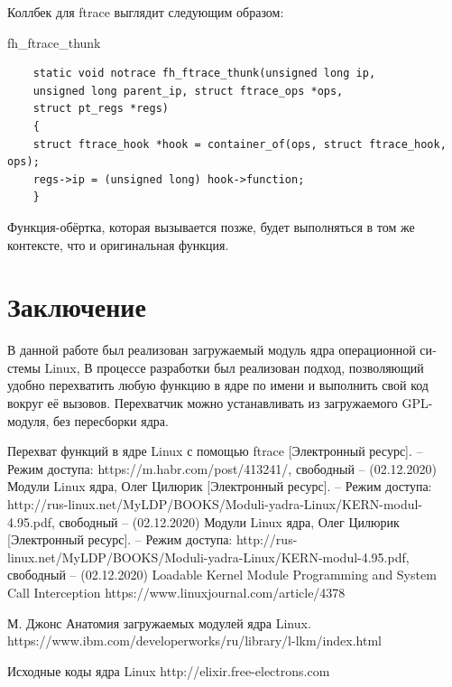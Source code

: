\documentclass[a4paper,14pt]{extarticle}
\begin{document}
Коллбек для ftrace выглядит следующим образом:

\begin{listing}[h]
	\caption{fh\_ftrace\_thunk}
	\begin{verbatim}
	static void notrace fh_ftrace_thunk(unsigned long ip, 
	unsigned long parent_ip, struct ftrace_ops *ops, 
	struct pt_regs *regs)
	{
	struct ftrace_hook *hook = container_of(ops, struct ftrace_hook, ops);
	regs->ip = (unsigned long) hook->function;
	}
	\end{verbatim}
\end{listing}

Функция-обёртка, которая вызывается позже, будет выполняться в том же контексте, что и оригинальная функция.
 
 \newpage
 	
 	\newpage
 	\section*{Заключение}
 	
 	В данной работе был реализован загружаемый модуль ядра операционной си­стемы Linux, В процессе разработки был реализован подход, позволяющий удобно перехватить любую функцию в ядре по имени и выполнить свой код вокруг её вызовов. Перехватчик можно устанавливать из загружаемого GPL-модуля, без пересборки ядра.
 	
 	\newpage
 	
 	\begin{thebibliography}{5}
 		Перехват функций в ядре Linux с помощью ftrace [Электронный ресурс]. – Режим доступа: 
 		https://m.habr.com/post/413241/, 
 		свободный – (02.12.2020)
 		Модули Linux ядра, Олег Цилюрик [Электронный ресурс]. – Режим доступа: 
 		http://rus-linux.net/MyLDP/BOOKS/Moduli-yadra-Linux/KERN-modul-4.95.pdf, 
 		свободный – (02.12.2020)
 		Модули Linux ядра, Олег Цилюрик [Электронный ресурс]. – Режим доступа: 
 		http://rus-linux.net/MyLDP/BOOKS/Moduli-yadra-Linux/KERN-modul-4.95.pdf, 
 		свободный – (02.12.2020)
 		Loadable Kernel Module Programming and System Call Interception
 		https://www.linuxjournal.com/article/4378
 		
 		М. Джонс Анатомия загружаемых модулей ядра Linux.
 		https://www.ibm.com/developerworks/ru/library/l-lkm/index.html
 		
 		Исходные коды ядра Linux
 		http://elixir.free-electrons.com
 	\end{thebibliography}
 	
 
\end{document}

